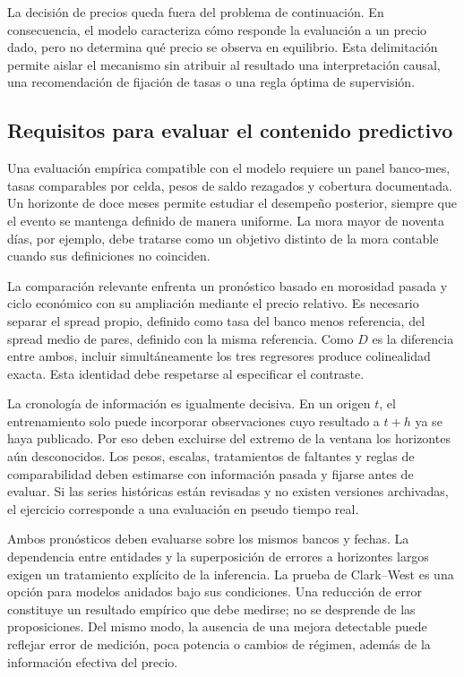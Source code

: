 \documentclass[11pt]{article}
\theoremstyle{definition}\newtheorem{assumption}{Supuesto}
\begin{document}
La decisión de precios queda fuera del problema de continuación. En
consecuencia, el modelo caracteriza cómo responde la evaluación a un precio
dado, pero no determina qué precio se observa en equilibrio. Esta delimitación
permite aislar el mecanismo sin atribuir al resultado una interpretación
causal, una recomendación de fijación de tasas o una regla óptima de supervisión.

\subsection{Requisitos para evaluar el contenido predictivo}
Una evaluación empírica compatible con el modelo requiere un panel banco-mes,
tasas comparables por celda, pesos de saldo rezagados y cobertura documentada.
Un horizonte de doce meses permite estudiar el desempeño posterior, siempre
que el evento se mantenga definido de manera uniforme. La mora mayor de
noventa días, por ejemplo, debe tratarse como un objetivo distinto de la mora
contable cuando sus definiciones no coinciden.

La comparación relevante enfrenta un pronóstico basado en morosidad pasada
y ciclo económico con su ampliación mediante el precio relativo. Es necesario
separar el spread propio, definido como tasa del banco menos referencia, del
spread medio de pares, definido con la misma referencia. Como $D$ es la
diferencia entre ambos, incluir simultáneamente los tres regresores produce
colinealidad exacta. Esta identidad debe respetarse al especificar el contraste.

La cronología de información es igualmente decisiva. En un origen $t$, el
entrenamiento solo puede incorporar observaciones cuyo resultado a $t+h$ ya
se haya publicado. Por eso deben excluirse del extremo de la ventana los
horizontes aún desconocidos. Los pesos, escalas, tratamientos de faltantes y
reglas de comparabilidad deben estimarse con información pasada y fijarse
antes de evaluar. Si las series históricas están revisadas y no existen
versiones archivadas, el ejercicio corresponde a una evaluación en pseudo
tiempo real.

Ambos pronósticos deben evaluarse sobre los mismos bancos y fechas. La
dependencia entre entidades y la superposición de errores a horizontes largos
exigen un tratamiento explícito de la inferencia. La prueba de Clark--West
es una opción para modelos anidados bajo sus condiciones. Una reducción de
error constituye un resultado empírico que debe medirse; no se desprende de
las proposiciones. Del mismo modo, la ausencia de una mejora detectable puede
reflejar error de medición, poca potencia o cambios de régimen, además de la
información efectiva del precio.
\end{document}

